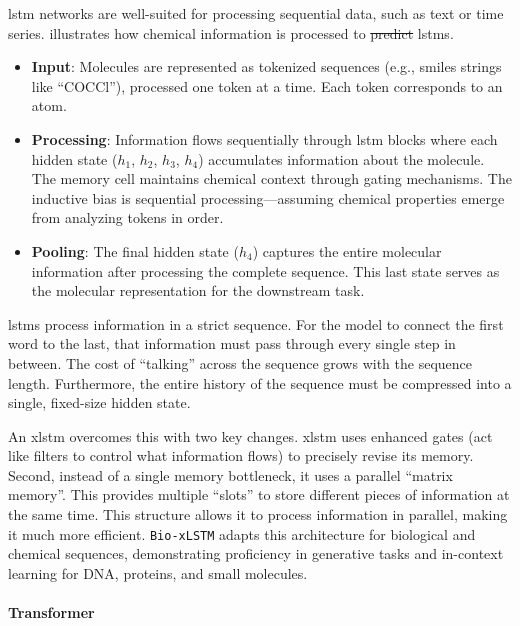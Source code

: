 \documentclass[11pt, oneside]{article}
\makeatletter
\newcommand{\modelname}[1]{\texttt{#1}}
\providecommand{\DIFaddtex}[1]{{\protect\color{blue}\uwave{#1}}} %
\providecommand{\DIFdeltex}[1]{{\protect\color{red}\sout{#1}}} %
\providecommand{\DIFaddbegin}{} %
\providecommand{\DIFaddend}{} %
\providecommand{\DIFdelbegin}{} %
\providecommand{\DIFdelend}{} %
\providecommand{\DIFadd}[1]{\texorpdfstring{\DIFaddtex{#1}}{#1}} %
\providecommand{\DIFdel}[1]{\texorpdfstring{\DIFdeltex{#1}}{}} %
\newcommand{\DIFscaledelfig}{0.5}
\newlength{\DIFdelgraphicswidth} %
\newlength{\DIFdelgraphicsheight} %
\newcommand{\DIFaddincludegraphics}[2][]{{\color{blue}\fbox{\DIFOincludegraphics[#1]{#2}}}} %
\newcommand{\DIFdelincludegraphics}[2][]{%
\sbox{\DIFdelgraphicsbox}{\DIFOincludegraphics[#1]{#2}}%
\settoboxwidth{\DIFdelgraphicswidth}{\DIFdelgraphicsbox} %
\settoboxtotalheight{\DIFdelgraphicsheight}{\DIFdelgraphicsbox} %
\scalebox{\DIFscaledelfig}{%
\parbox[b]{\DIFdelgraphicswidth}{\usebox{\DIFdelgraphicsbox}\\[-\baselineskip] \rule{\DIFdelgraphicswidth}{0em}}\llap{\resizebox{\DIFdelgraphicswidth}{\DIFdelgraphicsheight}{%
\setlength{\unitlength}{\DIFdelgraphicswidth}%
\begin{picture}(1,1)%
\thicklines\linethickness{2pt} %
{\color[rgb]{1,0,0}\put(0,0){\framebox(1,1){}}}%
{\color[rgb]{1,0,0}\put(0,0){\line( 1,1){1}}}%
{\color[rgb]{1,0,0}\put(0,1){\line(1,-1){1}}}%
\end{picture}%
}\hspace*{3pt}}} %
} %
\DeclareRobustCommand{\DIFaddbegin}{\DIFOaddbegin \let\includegraphics\DIFaddincludegraphics} %
\DeclareRobustCommand{\DIFaddend}{\DIFOaddend \let\includegraphics\DIFOincludegraphics} %
\DeclareRobustCommand{\DIFdelbegin}{\DIFOdelbegin \let\includegraphics\DIFdelincludegraphics} %
\DeclareRobustCommand{\DIFdelend}{\DIFOaddend \let\includegraphics\DIFOincludegraphics} %
\let\sout@orig\sout %
\renewcommand{\sout}[1]{\ifmmode\text{\sout@orig{\ensuremath{#1}}}\else\sout@orig{#1}\fi} %
\makeatother
\begin{document}
\gls{lstm} networks \autocite{hochreiter1997long} are well-suited for processing sequential data, such as text or time series. 
 illustrates how chemical information is processed to \DIFdelbegin \DIFdel{predict }\DIFdelend \DIFaddbegin \DIFadd{predictions in }\DIFaddend \glspl{lstm}.
\begin{itemize}
    \item \textbf{Input}: Molecules are represented as tokenized sequences (e.g., \gls{smiles} strings like \enquote{COCCl}), processed one token at a time. Each token corresponds to an atom.
    \item \textbf{Processing}: Information flows sequentially through \gls{lstm} blocks where each hidden state ($h_{1}$, $h_{2}$, $h_{3}$, $h_{4}$) accumulates information about the molecule. The memory cell maintains chemical context through gating mechanisms. The inductive bias is sequential processing---assuming chemical properties emerge from analyzing tokens in order.
    \item \textbf{Pooling}: The final hidden state ($h_{4}$) captures the entire molecular information after processing the complete sequence. This last state serves as the molecular representation for the downstream task.
\end{itemize}

\glspl{lstm} process information in a strict sequence.  
For the model to connect the first word to the last, that information must pass through every single step in between. 
The \DIFaddbegin \DIFadd{computational }\DIFaddend cost of \enquote{talking} across the sequence grows with the sequence length. 
Furthermore, the entire history of the sequence must be compressed into a single, fixed-size hidden state.

An \gls{xlstm} overcomes this with two key changes. \gls{xlstm} uses enhanced gates (act like filters to control what information flows) to precisely revise its memory. Second, instead of a single memory bottleneck, it uses a parallel \enquote{matrix memory}. This provides multiple \enquote{slots} to store different pieces of information at the same time. This structure allows it to process information in parallel, making it much more efficient.
\modelname{Bio-xLSTM} adapts this architecture for biological and chemical sequences, demonstrating proficiency in generative tasks and in-context learning for DNA, proteins, and small molecules.\autocite{SchmidingerSSSH25}


\paragraph{Transformer}
\end{document}
